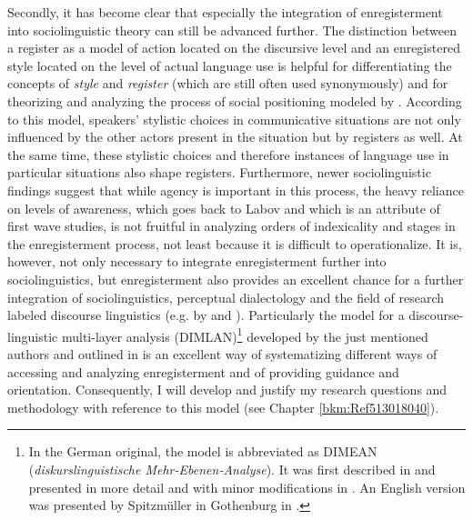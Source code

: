 Secondly, it has become clear that especially the integration of enregisterment into sociolinguistic theory can still be advanced further. The  distinction between a register as a model of action located on the discursive level and an enregistered style located on the level of actual language use is helpful for differentiating the concepts of \textit{style} and \textit{register} (which are still often used synonymously) and for theorizing and analyzing the process of social positioning modeled by \citet{Spitzmuller2013}. According to this model, speakers’ stylistic choices in communicative situations are not only influenced by the other actors present in the situation but by registers as well. At the same time, these stylistic choices and therefore instances of language use in particular situations also shape registers. Furthermore, newer sociolinguistic findings suggest that while agency is important in this process, the heavy reliance on levels of awareness, which goes back to Labov and which is an attribute of first wave studies, is not fruitful in analyzing orders of indexicality and stages in the enregisterment process, not least because it is difficult to operationalize. It is, however, not only necessary to integrate enregisterment further into sociolinguistics, but enregisterment also provides an excellent chance for a further integration of sociolinguistics, perceptual dialectology and the field of research labeled discourse linguistics (e.g. by \citealt{Warnke2008b} and \citealt{Spitzmuller2011}). Particularly the model for a discourse-linguistic multi-layer analysis (DIMLAN)\footnote{In the German original, the model is abbreviated as DIMEAN (\emph{diskurslinguistische Mehr-Ebenen-Analyse}). It was first described in \citet{Warnke2008b} and presented in more detail and with minor modifications in \citet{Spitzmuller2011}. An English version was presented by Spitzmüller in Gothenburg in \citeyear{Spitzmuller2014}.} developed by the just mentioned authors and outlined in  is an excellent way of systematizing different ways of accessing and analyzing enregisterment and of providing guidance and orientation. Consequently, I will develop and justify my research questions and methodology with reference to this model (see Chapter \ref{bkm:Ref513018040}).

